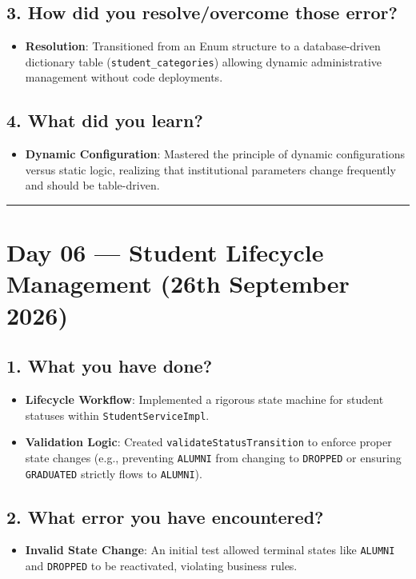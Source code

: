 \documentclass[12pt]{article}
\begin{document}
\subsection*{3. How did you resolve/overcome those error?}
\begin{itemize}
    \item \textbf{Resolution}: Transitioned from an Enum structure to a database-driven dictionary table (\texttt{student\_categories}) allowing dynamic administrative management without code deployments.
\end{itemize}

\subsection*{4. What did you learn?}
\begin{itemize}
    \item \textbf{Dynamic Configuration}: Mastered the principle of dynamic configurations versus static logic, realizing that institutional parameters change frequently and should be table-driven.
\end{itemize}

\vspace{0.5cm}
\hrule
\vspace{0.5cm}

\section*{Day 06 --- Student Lifecycle Management (26th September 2026)}

\subsection*{1. What you have done?}
\begin{itemize}
    \item \textbf{Lifecycle Workflow}: Implemented a rigorous state machine for student statuses within \texttt{StudentServiceImpl}.
    \item \textbf{Validation Logic}: Created \texttt{validateStatusTransition} to enforce proper state changes (e.g., preventing \texttt{ALUMNI} from changing to \texttt{DROPPED} or ensuring \texttt{GRADUATED} strictly flows to \texttt{ALUMNI}).
\end{itemize}

\subsection*{2. What error you have encountered?}
\begin{itemize}
    \item \textbf{Invalid State Change}: An initial test allowed terminal states like \texttt{ALUMNI} and \texttt{DROPPED} to be reactivated, violating business rules.
\end{itemize}
\end{document}
